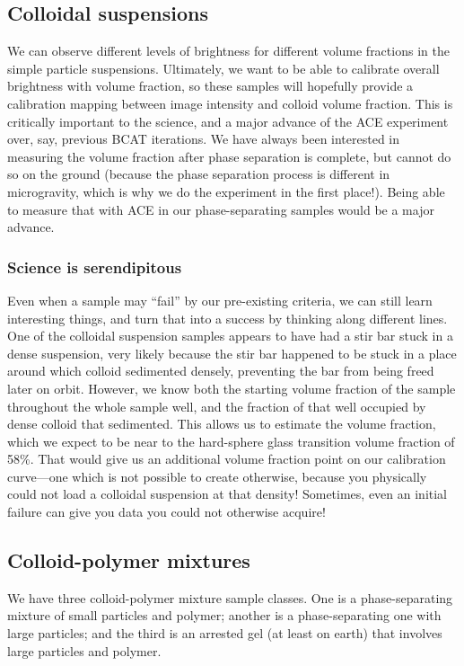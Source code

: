 \subsection{Colloidal
suspensions}\hypertarget{colloidal-suspensions}{}\label{colloidal-suspensions} We can observe different levels of brightness for different volume fractions in
the simple particle suspensions. Ultimately, we want to be able to calibrate
overall brightness with volume fraction, so these samples will hopefully provide
a calibration mapping between image intensity and colloid volume fraction. This
is critically important to the science, and a major advance of the ACE
experiment over, say, previous BCAT iterations. We have always been interested
in measuring the volume fraction after phase separation is complete, but cannot
do so on the ground (because the phase separation process is different in
microgravity, which is why we do the experiment in the first place!). Being able
to measure that with ACE in our phase-separating samples would be a major
advance.

\subsubsection{Science is
serendipitous}\hypertarget{science-is-serendipitous}{}\label{science-is-serendipitous} Even when a sample may ``fail'' by our pre-existing criteria, we can still learn
interesting things, and turn that into a success by thinking along different
lines. One of the colloidal suspension samples appears to have had a stir bar
stuck in a dense suspension, very likely because the stir bar happened to be
stuck in a place around which colloid sedimented densely, preventing the bar
from being freed later on orbit. However, we know both the starting volume
fraction of the sample throughout the whole sample well, and the fraction of
that well occupied by dense colloid that sedimented. This allows us to estimate
the volume fraction, which we expect to be near to the hard-sphere glass
transition volume fraction of 58\%. That would give us an additional volume
fraction point on our calibration curve---one which is not possible to create
otherwise, because you physically could not load a colloidal suspension at that
density! Sometimes, even an initial failure can give you data you could not
otherwise acquire!

\subsection{Colloid-polymer
mixtures}\hypertarget{colloid-polymer-mixtures}{}\label{colloid-polymer-mixtures} We have three colloid-polymer mixture sample classes. One is a phase-separating
mixture of small particles and polymer; another is a phase-separating one with
large particles; and the third is an arrested gel (at least on earth) that
involves large particles and polymer.

